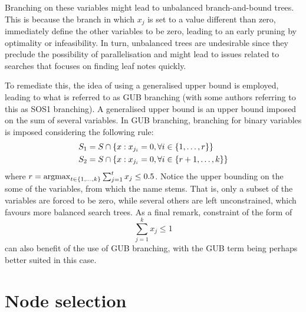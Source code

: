 Branching on these variables might lead to unbalanced branch-and-bound trees. This is because the branch in which $x_j$ is set to a value different than zero, immediately define the other variables to be zero, leading to an early pruning by optimality or infeasibility. In turn, unbalanced trees are undesirable since they preclude the possibility of parallelisation and might lead to issues related to searches that focuses on finding leaf notes quickly.

To remediate this, the idea of using a generalised upper bound is employed, leading to what is referred to as GUB branching (with some authors referring to this as SOS1 branching). A generalised upper bound is an upper bound imposed on the sum of several variables. In GUB branching, branching for binary variables is imposed considering the following rule:
%
\begin{align*}
	&S_1 = S \cap \left\{ x : x_{j_i} = 0, \forall i \in \left\{ 1,\dots,r \right \}  \right \} \\
	&S_2 = S \cap \left\{ x : x_{j_i} = 0, \forall i \in \left\{ r+1,\dots,k \right \}  \right \}
\end{align*} 
%
where $r = \mathop{\rm argmax}_{t \in \left\{ 1,\dots,k \right \}} \sum_{j=1}^t x_j \leq 0.5$. Notice the upper bounding on the some of the variables, from which the name stems. That is, only a subset of the variables are forced to be zero, while several others are left unconstrained, which favours more balanced search trees. As a final remark, constraint of the form of
%
\begin{equation*}
	\sum_{j = 1}^k x_j \le 1	
\end{equation*}
%
can also benefit of the use of GUB branching, with the GUB term being perhaps better suited in this case. 


\section{Node selection}


